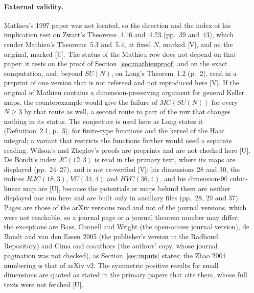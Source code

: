 \documentclass[11pt]{article}
\theoremstyle{remark}
\begin{document}
\paragraph{External validity.} Mathieu's 1997 paper was not located, so the direction and the index of his implication rest on Zwart's Theorems~4.16 and~4.23 (pp.~39 and~43), which render Mathieu's Theorems~5.3 and~5.4, at fixed $N$, marked [V], and on the original, marked [U]. The status of the Mathieu row does not depend on that paper: it rests on the proof of Section~\ref{sec:mathieuproof} and on the exact computation, and, beyond $SU(N)$, on Long's Theorem~1.2 (p.~2), read in a preprint of one version that is not refereed and not reproduced here [V]. If the original of Mathieu contains a dimension-preserving argument for general Keller maps, the counterexample would give the failure of $MC(SU(N))$ for every $N\ge3$ by that route as well, a second route to part of the row that changes nothing in its status. The conjecture is used here as Long states it (Definition~2.1, p.~3), for finite-type functions and the kernel of the Haar integral; a variant that restricts the functions further would need a separate reading. Wilson's and Zheglov's proofs are preprints and are not checked here [U]. De Bondt's index $JC(12,3)$ is read in the primary text, where its maps are displayed (pp.~24--27), and is not re-verified [V]; his dimensions 28 and 30, the indices $HJC(18,3)$, $VC(34,4)$ and $HVC(36,4)$, and his dimension-90 cubic-linear map are [U], because the potentials or maps behind them are neither displayed nor run here and are built only in ancillary files (pp.~28, 29 and 37). Pages are those of the arXiv versions read and not of the journal versions, which were not reachable, so a journal page or a journal theorem number may differ; the exceptions are Bass, Connell and Wright (the open-access journal version), de Bondt and van den Essen 2005 (the publisher's version in the Radboud Repository) and Cima and coauthors (the authors' copy, whose journal pagination was not checked), as Section~\ref{sec:inputs} states; the Zhao 2004 numbering is that of arXiv v2. The symmetric positive results for small dimensions are quoted as stated in the primary papers that cite them, whose full texts were not fetched [U].
\end{document}
